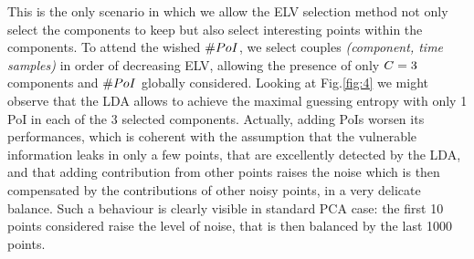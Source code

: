 This is the only scenario in which we allow the ELV selection method not only select the components to keep but also select interesting points within the components. To attend the wished $\# PoI$, we select couples \textit{(component, time samples)} in order of decreasing ELV, allowing the presence of only $C = 3$ components and $\# PoI$ globally considered.
Looking at Fig.\ref{fig:4} we might observe that the LDA allows to achieve the maximal guessing entropy with only 1 PoI in each of the 3 selected components. 
Actually, adding PoIs worsen its performances, which is coherent with the assumption that the vulnerable information leaks in only a few points, that are excellently detected by the LDA, and that adding contribution from other points raises the noise which is then compensated by the contributions of other noisy points, in a very delicate balance. Such a behaviour is clearly visible in standard PCA case: the first 10 points considered raise the level of noise, that is then balanced by the last 1000 points.



